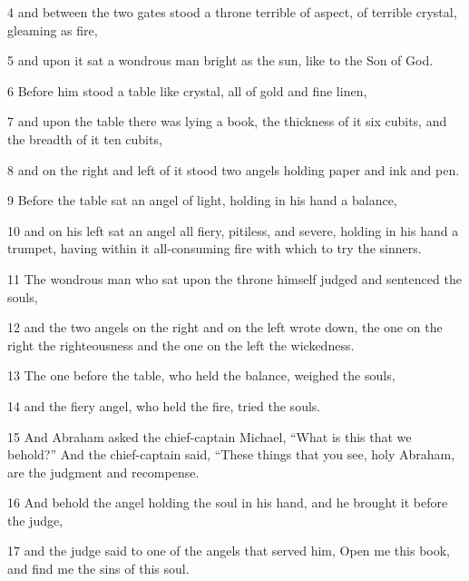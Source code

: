 \par 4 and between the two gates stood a throne terrible of aspect, of terrible crystal, gleaming as fire, 

\par 5 and upon it sat a wondrous man bright as the sun, like to the Son of God. 

\par 6 Before him stood a table like crystal, all of gold and fine linen, 

\par 7 and upon the table there was lying a book, the thickness of it six cubits, and the breadth of it ten cubits, 

\par 8 and on the right and left of it stood two angels holding paper and ink and pen. 

\par 9 Before the table sat an angel of light, holding in his hand a balance, 

\par 10 and on his left sat an angel all fiery, pitiless, and severe, holding in his hand a trumpet, having within it all-consuming fire with which to try the sinners. 

\par 11 The wondrous man who sat upon the throne himself judged and sentenced the souls, 

\par 12 and the two angels on the right and on the left wrote down, the one on the right the righteousness and the one on the left the wickedness. 

\par 13 The one before the table, who held the balance, weighed the souls, 

\par 14 and the fiery angel, who held the fire, tried the souls. 

\par 15 And Abraham asked the chief-captain Michael, “What is this that we behold?” And the chief-captain said, “These things that you see, holy Abraham, are the judgment and recompense. 

\par 16 And behold the angel holding the soul in his hand, and he brought it before the judge, 

\par 17 and the judge said to one of the angels that served him, Open me this book, and find me the sins of this soul. 

